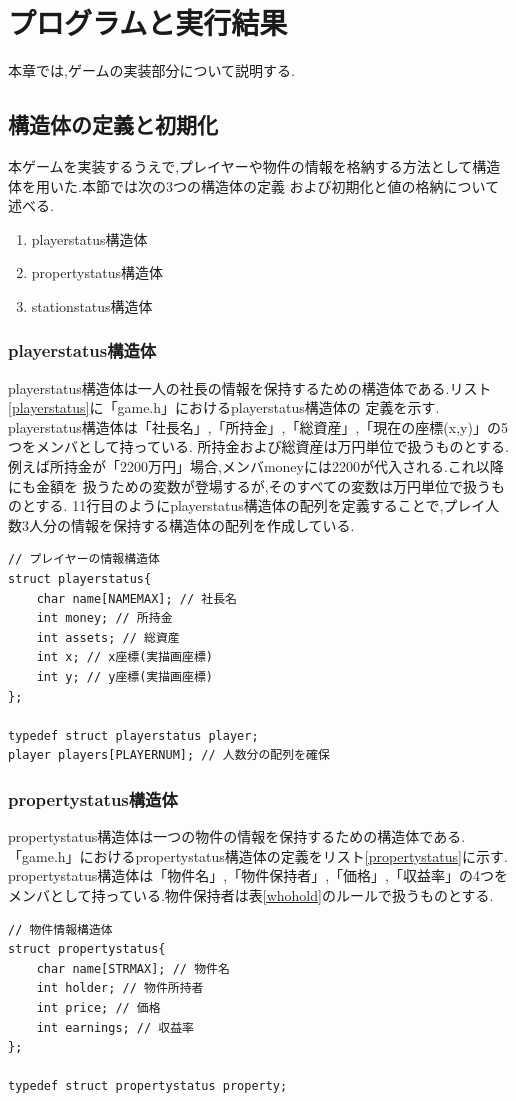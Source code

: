 \documentclass[a4j]{jarticle}
\begin{document}
    \section{プログラムと実行結果}
    本章では,ゲームの実装部分について説明する.
    \subsection{構造体の定義と初期化}
    本ゲームを実装するうえで,プレイヤーや物件の情報を格納する方法として構造体を用いた.本節では次の3つの構造体の定義
    および初期化と値の格納について述べる.
    \begin{enumerate}
      \item playerstatus構造体
      \item propertystatus構造体
      \item stationstatus構造体
    \end{enumerate}

    \subsubsection{playerstatus構造体}
    playerstatus構造体は一人の社長の情報を保持するための構造体である.リスト\ref{playerstatus}に「game.h」におけるplayerstatus構造体の
    定義を示す. playerstatus構造体は「社長名」,「所持金」,「総資産」,「現在の座標(x,y)」の5つをメンバとして持っている.
    所持金および総資産は万円単位で扱うものとする.例えば所持金が「2200万円」場合,メンバmoneyには2200が代入される.これ以降にも金額を
    扱うための変数が登場するが,そのすべての変数は万円単位で扱うものとする.
    11行目のようにplayerstatus構造体の配列を定義することで,プレイ人数3人分の情報を保持する構造体の配列を作成している.
    \begin{lstlisting}[basicstyle=\ttfamily\footnotesize, frame=single,label=playerstatus,caption=playerstatus構造体の定義と初期化]
// プレイヤーの情報構造体
struct playerstatus{
    char name[NAMEMAX]; // 社長名
    int money; // 所持金
    int assets; // 総資産
    int x; // x座標(実描画座標)
    int y; // y座標(実描画座標)
};

typedef struct playerstatus player;
player players[PLAYERNUM]; // 人数分の配列を確保
    \end{lstlisting}

    \subsubsection{propertystatus構造体}
    propertystatus構造体は一つの物件の情報を保持するための構造体である.「game.h」におけるpropertystatus構造体の定義をリスト\ref{propertystatus}に示す.
     propertystatus構造体は「物件名」,「物件保持者」,「価格」,「収益率」の4つをメンバとして持っている.物件保持者は表\ref{whohold}のルールで扱うものとする.
    \begin{lstlisting}[basicstyle=\ttfamily\footnotesize, frame=single,label=propertystatus,caption=propertystatus構造体の定義]
// 物件情報構造体
struct propertystatus{
    char name[STRMAX]; // 物件名
    int holder; // 物件所持者
    int price; // 価格
    int earnings; // 収益率
};

typedef struct propertystatus property;
    \end{lstlisting}
\end{document}

